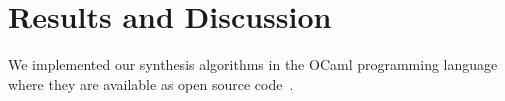 \documentclass[12pt]{article}
\begin{document}
{\section{Results and Discussion}




We implemented our synthesis algorithms in the OCaml programming language
where they are available as open
source code~\cite{BijectiveOptician,QuotientOptician,SymmetricOptician}. 

}
\end{document}
